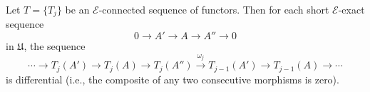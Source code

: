 Let $T = \{T_j\}$ be an $\mathcal{E}$-connected sequence of functors. Then for each short $\mathcal{E}$-exact sequence
$$0 \rightarrow A' \rightarrow A \rightarrow A'' \rightarrow 0$$
in $\mathfrak{U}$, the sequence
$$\cdots \rightarrow T_j(A') \rightarrow T_j(A) \rightarrow T_j(A'') \xrightarrow{\omega_j} T_{j-1}(A') \rightarrow T_{j-1}(A) \rightarrow \cdots$$
is differential (i.e., the composite of any two consecutive morphisms is zero).
